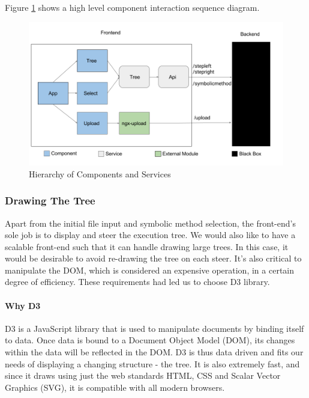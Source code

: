 \documentclass[titlepage,11pt]{article}
\begin{document}
Figure \ref{fig:frontend-arch} shows a high level component interaction sequence diagram.

\begin{figure}
\centering
\includegraphics[scale=0.45]{frontend-architecture.png}
\caption{Hierarchy of Components and Services}
\label{fig:frontend-arch}
\end{figure}
    
\subsubsection{Drawing The Tree}
Apart from the initial file input and symbolic method selection, the front-end's sole job is to display and steer the execution tree. We would also like to have a scalable front-end such that it can handle drawing large trees. In this case, it would be desirable to avoid re-drawing the tree on each steer. It's also critical to manipulate the DOM, which is considered an expensive operation, in a certain degree of efficiency. These requirements had led us to choose D3 \cite{d3} library.

\paragraph{Why D3}

D3 \cite{d3} is a JavaScript library that is used to manipulate documents by binding itself to data. Once data is bound to a Document Object Model (DOM), its changes within the data will be reflected in the DOM. D3 is thus data driven and fits our needs of displaying a changing structure - the tree. It is also extremely fast, and since it draws using just the web standards HTML, CSS and Scalar Vector Graphics (SVG), it is compatible with all modern browsers. \\
\end{document}
